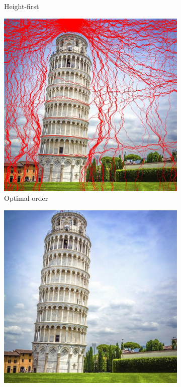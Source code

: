 \documentclass[final]{cvpr}
\begin{document}
\begin{figure}[htb]
\begin{center}
\begin{subfigure}[b]{0.30\linewidth}
    \caption{Height-first}
\end{subfigure}
\begin{subfigure}[b]{0.30\linewidth}
    \includegraphics[width=\textwidth]{pisa_seam_carving_optimal_order_records.jpg}
    \caption{Optimal-order}
\end{subfigure}
\begin{subfigure}[b]{0.30\linewidth}
    \includegraphics[width=\textwidth]{pisa_seam_carving_width_first.jpg}

\end{subfigure}
\end{center}
\end{figure}
\end{document}
